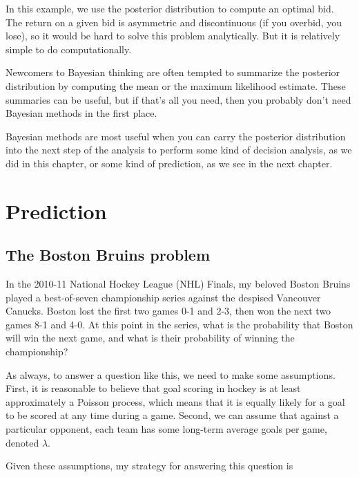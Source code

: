 \documentclass[12pt]{book}
\begin{document}
In this example, we use the posterior distribution
to compute an optimal bid.  The return on a given bid is asymmetric
and discontinuous (if you overbid, you lose), so it would be hard to
solve this problem analytically.  But it is relatively simple to do
computationally.

Newcomers to Bayesian thinking are often tempted to summarize the
posterior distribution by computing the mean or the maximum
likelihood estimate.  These summaries can be useful, but if that's
all you need, then you probably don't need Bayesian methods in the
first place.

Bayesian methods are most useful when you can carry the posterior
distribution into the next step of the analysis to perform some
kind of decision analysis, as we did in this chapter, or some kind of
prediction, as we see in the next chapter.



\chapter{Prediction}
\label{prediction}

\section{The Boston Bruins problem}

In the 2010-11 National Hockey League (NHL) Finals, my beloved Boston
Bruins played a best-of-seven championship series against the despised
Vancouver Canucks.  Boston lost the first two games 0-1 and 2-3, then
won the next two games 8-1 and 4-0.  At this point in the series, what
is the probability that Boston will win the next game, and what is
their probability of winning the championship?

As always, to answer a question like this, we need to make some
assumptions.  First, it is reasonable to believe that goal scoring in
hockey is at least approximately a Poisson process, which means that
it is equally likely for a goal to be scored at any time during a
game.  Second, we can assume that against a particular opponent, each team
has some long-term average goals per game, denoted $\lambda$.

Given these assumptions, my strategy for answering this question is
\end{document}
